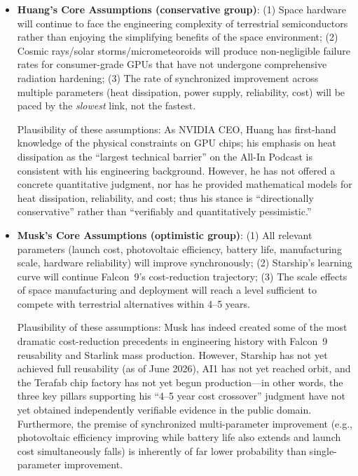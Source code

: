 \begin{itemize}[leftmargin=*]
    \item \textbf{Huang's Core Assumptions (conservative group)}: (1) Space hardware will continue to face the engineering complexity of terrestrial semiconductors rather than enjoying the simplifying benefits of the space environment; (2) Cosmic rays/solar storms/micrometeoroids will produce non-negligible failure rates for consumer-grade GPUs that have not undergone comprehensive radiation hardening; (3) The rate of synchronized improvement across multiple parameters (heat dissipation, power supply, reliability, cost) will be paced by the \emph{slowest} link, not the fastest.

    Plausibility of these assumptions: As NVIDIA CEO, Huang has first-hand knowledge of the physical constraints on GPU chips; his emphasis on heat dissipation as the ``largest technical barrier'' on the All-In Podcast is consistent with his engineering background. However, he has not offered a concrete quantitative judgment, nor has he provided mathematical models for heat dissipation, reliability, and cost; thus his stance is ``directionally conservative'' rather than ``verifiably and quantitatively pessimistic.''

    \item \textbf{Musk's Core Assumptions (optimistic group)}: (1) All relevant parameters (launch cost, photovoltaic efficiency, battery life, manufacturing scale, hardware reliability) will improve synchronously; (2) Starship's learning curve will continue Falcon~9's cost-reduction trajectory; (3) The scale effects of space manufacturing and deployment will reach a level sufficient to compete with terrestrial alternatives within 4--5 years.

    Plausibility of these assumptions: Musk has indeed created some of the most dramatic cost-reduction precedents in engineering history with Falcon~9 reusability and Starlink mass production. However, Starship has not yet achieved full reusability (as of June 2026), AI1 has not yet reached orbit, and the Terafab chip factory has not yet begun production---in other words, the three key pillars supporting his ``4--5 year cost crossover'' judgment have not yet obtained independently verifiable evidence in the public domain. Furthermore, the premise of synchronized multi-parameter improvement (e.g., photovoltaic efficiency improving while battery life also extends and launch cost simultaneously falls) is inherently of far lower probability than single-parameter improvement.
\end{itemize}

